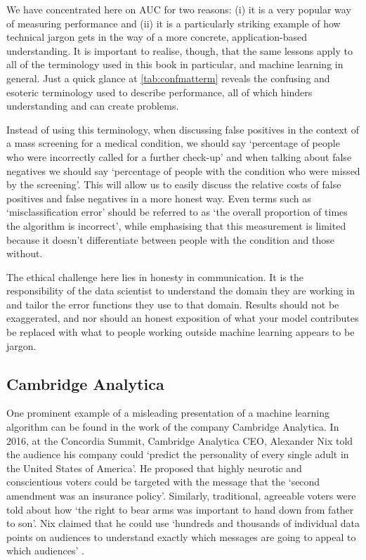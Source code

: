 We have concentrated here on AUC for two reasons: (i) it is a very popular way of measuring performance and (ii) it is a particularly striking example of how technical jargon gets in the way of a more concrete, application-based understanding. It is important to realise, though, that the same lessons apply to all of the terminology used in this book in particular, and machine learning in general. Just a quick glance at \cref{tab:confmatterm} reveals the confusing and esoteric terminology used to describe performance, all of which hinders understanding and can create problems.

Instead of using this terminology, when discussing false positives in the context of a mass screening for a medical condition, we should say `percentage of people who were incorrectly called for a further check-up' and when talking about false negatives we should say `percentage of people with the condition who were missed by the screening'. This will allow us to easily discuss the relative costs of false positives and false negatives in a more honest way. Even terms such as `misclassification error' should be referred to as `the overall proportion of times the algorithm is incorrect', while emphasising that this measurement is limited because it doesn't differentiate between people with the condition and those without.

The ethical challenge here lies in honesty in communication. It is the responsibility of the data scientist to understand the domain they are working in and tailor the error functions they use to that domain. Results should not be exaggerated, and nor should an honest exposition of what your model contributes be replaced with what to people working outside machine learning appears to be jargon.

\subsection{Cambridge Analytica}

One prominent example of a misleading presentation of a machine learning algorithm can be found in the work of the company Cambridge Analytica. In 2016, at the Concordia Summit, Cambridge Analytica CEO, Alexander Nix told the audience his company could `predict the personality of every single adult in the United States of America'. He proposed that highly neurotic and conscientious voters could be targeted with the message that the `second amendment was an insurance policy'. Similarly, traditional, agreeable voters were told about how `the right to bear arms was important to hand down from father to son'. Nix claimed that he could use `hundreds and thousands of individual data points on audiences to understand exactly which messages are going to appeal to which audiences' \parencite{sumpter2018outnumbered}.

